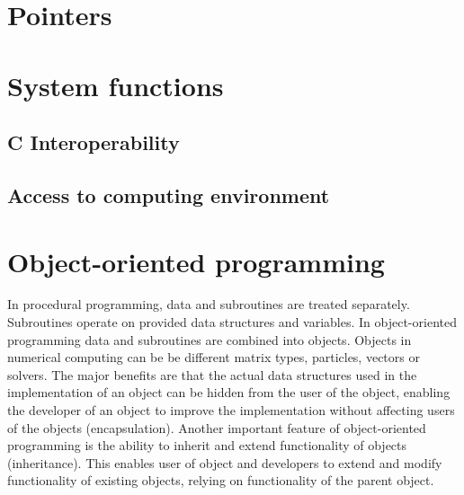 \section{Pointers}



\section{System functions}

\subsection{C Interoperability}



\subsection{Access to computing environment}

\section{Object-oriented programming}

In procedural programming, data and subroutines are treated separately. Subroutines operate on provided data structures and variables. In object-oriented programming data and subroutines are combined into objects. Objects in numerical computing can be  be different matrix types, particles, vectors or solvers. The major benefits are that the actual data structures used in the implementation of an object can be hidden from the user of the object, enabling the developer of an object to improve the implementation without affecting users of the objects (encapsulation). Another important feature of object-oriented programming is the ability to inherit and extend functionality of objects (inheritance). This enables user of object and developers to extend and modify functionality of existing objects, relying on functionality of the parent object. 

